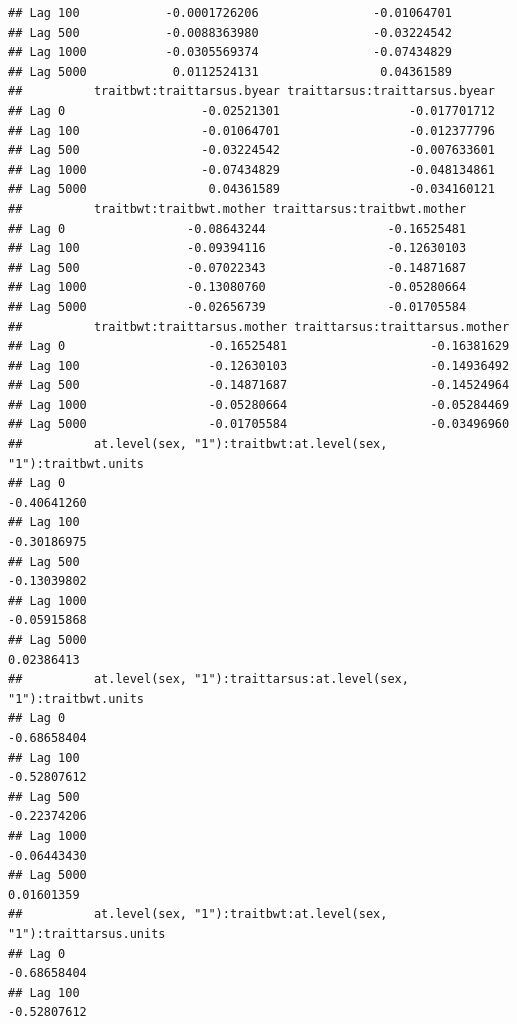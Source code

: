 \documentclass[
  12pt,
]{book}
\begin{document}
\begin{verbatim}
## Lag 100            -0.0001726206                -0.01064701
## Lag 500            -0.0088363980                -0.03224542
## Lag 1000           -0.0305569374                -0.07434829
## Lag 5000            0.0112524131                 0.04361589
##          traitbwt:traittarsus.byear traittarsus:traittarsus.byear
## Lag 0                   -0.02521301                  -0.017701712
## Lag 100                 -0.01064701                  -0.012377796
## Lag 500                 -0.03224542                  -0.007633601
## Lag 1000                -0.07434829                  -0.048134861
## Lag 5000                 0.04361589                  -0.034160121
##          traitbwt:traitbwt.mother traittarsus:traitbwt.mother
## Lag 0                 -0.08643244                 -0.16525481
## Lag 100               -0.09394116                 -0.12630103
## Lag 500               -0.07022343                 -0.14871687
## Lag 1000              -0.13080760                 -0.05280664
## Lag 5000              -0.02656739                 -0.01705584
##          traitbwt:traittarsus.mother traittarsus:traittarsus.mother
## Lag 0                    -0.16525481                    -0.16381629
## Lag 100                  -0.12630103                    -0.14936492
## Lag 500                  -0.14871687                    -0.14524964
## Lag 1000                 -0.05280664                    -0.05284469
## Lag 5000                 -0.01705584                    -0.03496960
##          at.level(sex, "1"):traitbwt:at.level(sex, "1"):traitbwt.units
## Lag 0                                                      -0.40641260
## Lag 100                                                    -0.30186975
## Lag 500                                                    -0.13039802
## Lag 1000                                                   -0.05915868
## Lag 5000                                                    0.02386413
##          at.level(sex, "1"):traittarsus:at.level(sex, "1"):traitbwt.units
## Lag 0                                                         -0.68658404
## Lag 100                                                       -0.52807612
## Lag 500                                                       -0.22374206
## Lag 1000                                                      -0.06443430
## Lag 5000                                                       0.01601359
##          at.level(sex, "1"):traitbwt:at.level(sex, "1"):traittarsus.units
## Lag 0                                                         -0.68658404
## Lag 100                                                       -0.52807612

\end{verbatim}
\end{document}
